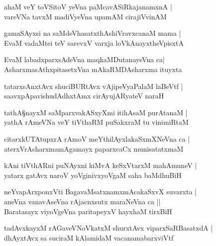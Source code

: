 \begin{shloka}
ahaM veY toVSitoV yeVna paMcavASiRkajanamxnA |\\
vareVNa tavxM madiVyeVna upamAM cirajiVvinAM
\end{shloka}

\begin{shloka}
gamaSAyxsi na saMdeVhasatxthAshiVravxcanaM mama |\\
EvaM vadaMtei teV sarevxV varxja loVkAnayxtheVpisxtA\R
\end{shloka}

\begin{shloka}
EvaM labadxparxsAdeVna maqkaMDutanayeVna ca|\\
AsharxmasAthxpitasetxVna mAkaRMDAsharxma ituyxta 
\end{shloka}

\begin{shloka}
tatarxsAnxtAvx shuciBURtAvx vAjipeVyaPalaM laBeVtf |\\
saavxpApavishudAdhxtAmx cirAyujARyateV naraH 
\end{shloka}

\begin{shloka}
tathA\S nayxM saMparxvakASxyXmi itihAsaM purAtanaM |\\
yathA rAmeVNa veY tiVthaRM puSakxraM tu vinimiRtaM
\end{shloka}

\begin{shloka}
citarxkUTAtupxrA rAmoV meYthilAyxlakaSxmXNeVna ca |\\
aterxVrAsharxmamAgamayx paparxcaCx munisatatxmaM 
\end{shloka}

\begin{shloka}
kAni tiVthARni puNAyxni kiMvA keSxVtarxM mahAmuneV |\\
yatarx gatAvx naroV yoVginivxyoVgaM saha baMdhuBiH 
\end{shloka}

\begin{shloka}
neYvapArxponxVti BagavaMsatxnamxmAcakaSxvX suvarxta |\\
aneVna vanavAseVna rAjacnxsutx maraNeVna ca ||\\
Baratasayx viyoVgeVna paritapeyxV hayxhaM tirxBiH
\end{shloka}

\begin{shloka}
tadAvxkayxM rAGaveVNoVkatxM shurxtAvx viparxSaRBasatxdA |\\
dhAyxtAvx sa suciraM kAlamidaM vacanamabarxviVtf
\end{shloka}

